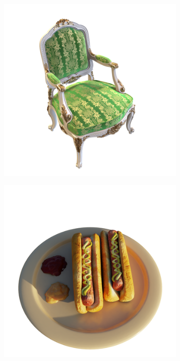 \documentclass{article}
\begin{document}
\begin{figure}[!h]
\begin{subfigure}{.24\textwidth}
\end{subfigure}
\begin{subfigure}{.24\textwidth}
  \centering
  \includegraphics[width=\linewidth]{figs/results/chair_ref.png}  
\end{subfigure}
\begin{subfigure}{.24\textwidth}
  \centering
  \includegraphics[width=\linewidth]{figs/results/hotdog_ref.png}  
\end{subfigure}



\end{figure}
\end{document}
